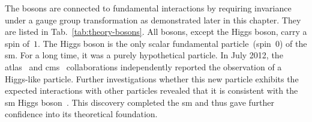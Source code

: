 

The bosons are connected to fundamental interactions by requiring invariance under a gauge group transformation as demonstrated later in this chapter. They are listed in Tab.~\ref{tab:theory-bosons}. All bosons, except the Higgs boson, carry a spin of~$1$. The Higgs boson is the only scalar fundamental particle~(spin~$0$) of the \gls{sm}. For a long time, it was a purely hypothetical particle. In July 2012, the \gls{atlas}~\cite{Aad:2012tfa} and \gls{cms}~\cite{Chatrchyan:2012xdj} collaborations independently reported the observation of a Higgs-like particle. Further investigations whether this new particle exhibits the expected interactions with other particles revealed that it is consistent with the \gls{sm} Higgs boson~\cite{Khachatryan:2016vau}. This discovery completed the \gls{sm} and thus gave further confidence into its theoretical foundation.


